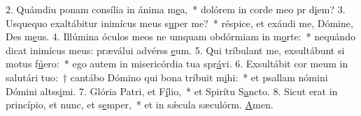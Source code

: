 2. Quámdiu ponam consília in ánima m\uline{e}a,~* dolórem in corde meo pr d\uline{i}em?
3. Usquequo exaltábitur inimícus meus s\uline{u}per me?~* réspice, et exáudi me, Dómine, Des m\uline{e}us.
4. Illúmina óculos meos ne umquam obdórmiam in m\uline{o}rte:~* nequándo dicat inimícus meus: præválui advérss \uline{e}um.
5. Qui tríbulant me, exsultábunt si motus f\uline{ú}ero:~* ego autem in misericórdia tua spr\uline{á}vi.
6. Exsultábit cor meum in salutári tuo:~† cantábo Dómino qui bona tríbuit m\uline{i}hi:~* et psallam nómini Dómini altss\uline{i}mi.
7. Glória Patri, et F\uline{í}lio,~* et Spirítu S\uline{a}ncto.
8. Sicut erat in princípio, et nunc, et s\uline{e}mper,~* et in sǽcula sæculórm. \uline{A}men.
